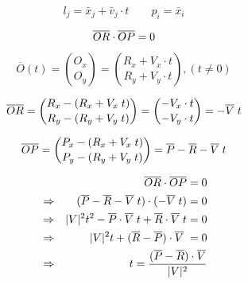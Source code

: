 \documentclass[a4paper]{article}
\begin{document}
$$
    l_j = \bar{x}_j + \bar{v}_j\cdot t    \qquad  p_i= \bar{x}_i
$$

$$
       \overline{OR}\cdot \overline{OP} = 0
$$

$$
   \overline{O}(t) = \binom{O_x}{O_y} = \binom{R_x + V_x\cdot t}{R_y+V_y\cdot t }, (t\ne 0)
$$

$$
       \overline{OR} = \binom{R_x -(R_x + V_x\; t)}{R_y - (R_y+V_y\; t)} = \binom{-V_x\cdot t}{-V_y\cdot t} = - \overline{V} \; t
$$

$$
       \overline{OP} = \binom{P_x -(R_x + V_x\; t)}{P_y-(R_y+V_y\; t)} = \overline{P}-\overline{R} - \overline{V}\; t
$$

\begin{eqnarray*}
    && \overline{OR}\cdot \overline{OP}=  0 \\
    &\Rightarrow& (\overline{P}-\overline{R} - \overline{V}\; t) \cdot (- \overline{V} \; t) = 0 \\
    &\Rightarrow& |V|^2t^2 - \overline{P}\cdot \overline{V}\; t + \overline{R}\cdot \overline{V}\; t = 0\\
     &\Rightarrow&  |V|^2t + (\overline{R}-\overline{P})\cdot \overline{V}\;  = 0  \\
  &\Rightarrow & t = \frac{(\overline{P}-\overline{R})\cdot\overline{V}}{|V|^2}
\end{eqnarray*}
\end{document}
